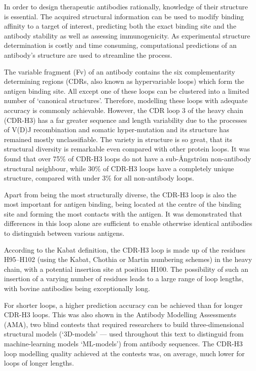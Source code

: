 \documentclass[12pt]{article}
\begin{document}
In order to design therapeutic antibodies rationally, knowledge of
their structure is essential. The acquired structural information can
be used to modify binding affinity to a target of interest,
predicting both the exact binding site and the antibody stability as
well as assessing immunogenicity\cite{Abhinandan2007}. As
experimental structure determination is costly and time
consuming, computational predictions of an antibody's structure are
used to streamline the process.

The variable
fragment (Fv) of an antibody contains the six complementarity determining regions
(CDRs, also known as hypervariable loops) which form the antigen binding site.
All except one of these loops can be clustered
into a limited number of `canonical structures'\cite{Al-Lazikani}. Therefore, modelling
these loops with adequate accuracy is commonly
achievable\cite{North2011}.  However, the CDR loop 3 of the 
heavy chain (CDR-H3) has a far greater sequence and length variability due to the
processes of V(D)J recombination and somatic hyper‐mutation and its
structure has remained mostly unclassifiable\cite{Finn2016}. The variety in
structure is so great, that its structural diversity is remarkable
even compared with other protein loops\cite{Regep2017}. It was found
that over 75\% of CDR-H3 loops do not have a sub-{\AA}ngstr\"{o}m non-antibody
structural neighbour, while 30\% of CDR-H3 loops have a
completely unique structure, compared with under 3\% for all non-antibody
loops\cite{Regep2017}.

Apart from being the most structurally diverse, the CDR-H3 loop is
also the most important for antigen binding, being located at the
centre of the binding site and forming the most contacts with the
antigen\cite{MacCallum1996}. It was demonstrated that
differences in this loop alone are sufficient to enable otherwise
identical antibodies to distinguish between various
antigens\cite{Xu2000}.

According to the Kabat definition, the CDR-H3 loop is made up of the
residues H95--H102 (using the Kabat\cite{Kabat1992}, Chothia\cite{Al-Lazikani} or Martin\cite{Abhinandan2008} numbering schemes) in the heavy
chain, with a potential insertion site at position H100. The
possibility of such an insertion of a varying number of residues leads
to a large range of loop lengths, with bovine antibodies being
exceptionally long.


For shorter loops, a higher prediction accuracy can be achieved than
for longer CDR-H3 loops. This was also shown in the Antibody Modelling
Assessments (AMA), two blind contests that required researchers to
build three-dimensional structural models (`3D-models' --- used throughout this text to distinguid from machine-learning models `ML-models') from antibody sequences. The CDR-H3 loop
modelling quality achieved at the contests was, on average, much lower
for loops of longer lengths\cite{Almagro2011,Almagro2014}.
\end{document}
